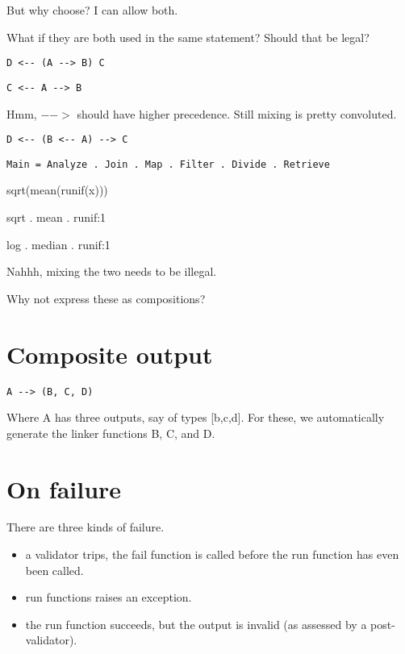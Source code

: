 \documentclass[12pt]{article}
\begin{document}
But why choose? I can allow both.

What if they are both used in the same statement? Should that be legal?

\begin{verbatim}
D <-- (A --> B) C 
\end{verbatim}

\begin{verbatim}
C <-- A --> B
\end{verbatim}

Hmm, $-->$ should have higher precedence. Still mixing is pretty convoluted.

\begin{verbatim}
D <-- (B <-- A) --> C
\end{verbatim}


\begin{verbatim}
Main = Analyze . Join . Map . Filter . Divide . Retrieve
\end{verbatim}


sqrt(mean(runif(x)))

sqrt . mean . runif:1

log . median . runif:1


Nahhh, mixing the two needs to be illegal.

Why not express these as compositions?


\section{Composite output}

\begin{verbatim}
A --> (B, C, D)
\end{verbatim}

Where A has three outputs, say of types [b,c,d]. For these, we automatically
generate the linker functions B, C, and D.

\section{On failure}

There are three kinds of failure.

\begin{itemize}
  \item a validator trips, the fail function is called before the run function has
     even been called.
  \item run functions raises an exception.
  \item the run function succeeds, but the output is invalid (as assessed by
     a post-validator).
\end{itemize}
\end{document}
